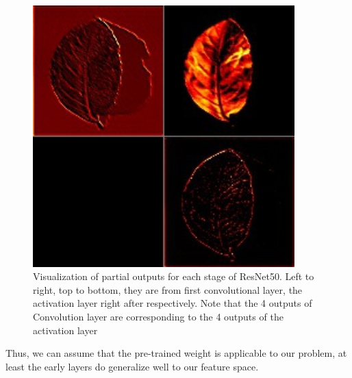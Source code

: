 \documentclass[journal, 10pt]{IEEEtran}
\begin{document}
\begin{figure}[H]
\begin{minipage}[b]{0.3\linewidth}
      \includegraphics[width=0.9\textwidth]{33214-a1.jpg}
      \vspace{4ex}
    \end{minipage}
    \caption{Visualization of partial outputs for each stage of ResNet50. Left to right, top to bottom, they are from first convolutional layer, the activation layer right after respectively. Note that the 4 outputs of Convolution layer are corresponding to the 4 outputs of the activation layer}
    \label{fig:visual_output}
  \end{figure}

  Thus, we can assume that the pre-trained weight is applicable to our problem, at least the early layers do generalize well to our feature space.
\end{document}

